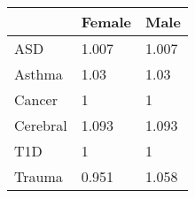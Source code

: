 \begin{table}[!tbp]
\begin{center}
\begin{tabular}{lll}
\hline\hline
\multicolumn{1}{l}{}&\multicolumn{1}{c}{Female}&\multicolumn{1}{c}{Male}\tabularnewline
\hline
ASD&1.007&1.007\tabularnewline
Asthma&1.03&1.03\tabularnewline
Cancer&1&1\tabularnewline
Cerebral&1.093&1.093\tabularnewline
T1D&1&1\tabularnewline
Trauma&0.951&1.058\tabularnewline
\hline
\end{tabular}\end{center}
\end{table}
